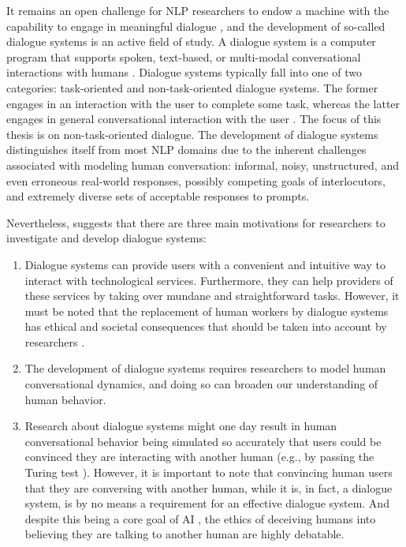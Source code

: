 

It remains an open challenge for NLP researchers to endow a machine with the capability to engage in meaningful dialogue \citep{burtsev-etal-2018-deeppavlov}, and the development of so-called dialogue systems is an active field of study.
A dialogue system is a computer program that supports spoken, text-based, or multi-modal conversational interactions with humans \citep{mctear2020conversational}.
Dialogue systems typically fall into one of two categories: task-oriented and non-task-oriented dialogue systems. The former engages in an interaction with the user to complete some task, whereas the latter engages in general conversational interaction with the user \citep{Kushneryk2019IntelligentDS}. The focus of this thesis is on non-task-oriented dialogue.
The development of dialogue systems distinguishes itself from most NLP domains due to the inherent challenges associated with modeling human conversation: informal, noisy, unstructured, and even erroneous real-world responses, possibly competing goals of interlocutors, and extremely diverse sets of acceptable responses to prompts.

Nevertheless, \cite{mctear2020conversational} suggests that there are three main motivations for researchers to investigate and develop dialogue systems:

\begin{enumerate}
    \item Dialogue systems can provide users with a convenient and intuitive way to interact with technological services. Furthermore, they can help providers of these services by taking over mundane and straightforward tasks. However, it must be noted that the replacement of human workers by dialogue systems has ethical and societal consequences that should be taken into account by researchers \citep{ivanov2020impact}. 
    \item The development of dialogue systems requires researchers to model human conversational dynamics, and doing so can broaden our understanding of human behavior.
    \item Research about dialogue systems might one day result in human conversational behavior being simulated so accurately that users could be convinced they are interacting with another human (e.g., by passing the Turing test \citep{oppy2003turing}). However, it is important to note that convincing human users that they are conversing with another human, while it is, in fact, a dialogue system, is by no means a requirement for an effective dialogue system. And despite this being a core goal of AI \citep{zheng2019personalized}, the ethics of deceiving humans into believing they are talking to another human are highly debatable.
\end{enumerate}

